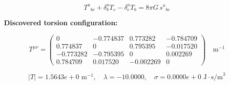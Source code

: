 
\begin{equation}
  T^a{}_{bc} + \delta^a_b T_c - \delta^a_c T_b = 8\pi G \, s^a{}_{bc}
\end{equation}

\textbf{Discovered torsion configuration:}

\begin{equation}
  T^{\mu\nu} = \begin{pmatrix}
    0 & -0.774837 & 0.773282 & -0.784709 \\
    0.774837 & 0 & 0.795395 & -0.017520 \\
    -0.773282 & -0.795395 & 0 & 0.002269 \\
    0.784709 & 0.017520 & -0.002269 & 0
  \end{pmatrix} \quad \text{m}^{-1}
\end{equation}

\begin{equation}
  |T| = 1.5643e+0 \text{ m}^{-1}, \quad
  \lambda = -10.0000, \quad
  \sigma = 0.0000e+0 \text{ J}\cdot\text{s/m}^3
\end{equation}